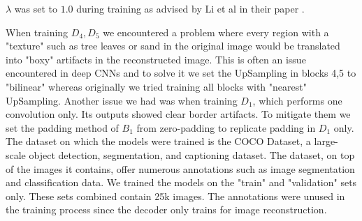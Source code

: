 $\lambda$ was set to $1.0$ during training as advised by Li et al in their paper \cite{bib11}.

When training $D_4, D_5$ we encountered a problem where every region with a "texture" such as tree leaves or sand in the original image would be translated into "boxy" artifacts in the reconstructed image. This is often an issue encountered in deep CNNs and to solve it we set the UpSampling in blocks 4,5 to "bilinear" whereas originally we tried training all blocks with "nearest" UpSampling. Another issue we had was when training $D_1$, which performs one convolution only. Its outputs showed clear border artifacts. To mitigate them we set the padding method of $B_1$ from zero-padding to replicate padding in $D_1$ only.\\

The dataset on which the models were trained is the COCO Dataset, a large-scale object detection, segmentation, and captioning dataset. The dataset, on top of the images it contains, offer numerous annotations such as image segmentation and classification data. We trained the models on the "train" and "validation" sets only. These sets combined contain 25k images. The annotations were unused in the training process since the decoder only trains for image reconstruction.